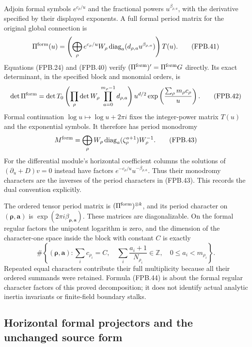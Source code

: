 Adjoin formal symbols \(e^{c_\rho/u}\) and the fractional powers
\(u^{\beta_{\rho,a}}\), with the derivative specified by their
displayed exponents. A full formal period matrix for the original
global connection is
\[
 \Pi^{\rm form}(u)=
   \left(\bigoplus_\rho
       e^{c_\rho/u}W_\rho
            \operatorname{diag}_a(d_{\rho,a}u^{\beta_{\rho,a}})
   \right)T(u).
 \tag{FPB.41}\label{eq:fpb-formal-period}
\]
Equations (FPB.24) and (FPB.40) verify
\((\Pi^{\rm form})'=\Pi^{\rm form}G\) directly. Its exact
determinant, in the specified block and monomial orders, is
\[
 \det\Pi^{\rm form}
   =\det T_0\left(\prod_\rho\det W_\rho
                              \prod_{a=0}^{m_\rho-1}d_{\rho,a}\right)
          u^{d/2}\exp\left(\frac{\sum_\rho m_\rho c_\rho}{u}\right).
 \tag{FPB.42}\label{eq:fpb-period-det}
\]
Formal continuation \(\log u\mapsto\log u+2\pi i\) fixes the
integer-power matrix \(T(u)\) and the exponential symbols. It
therefore has period monodromy
\[
 M^{\rm form}=\bigoplus_\rho
    W_\rho\operatorname{diag}_a(\zeta_\rho^{a+1})W_\rho^{-1}.
 \tag{FPB.43}\label{eq:fpb-formal-monodromy}
\]
For the differential module's horizontal coefficient columns the
solutions of \((\partial_u+D)v=0\) instead have factors
\(e^{-c_\rho/u}u^{-\beta_{\rho,a}}\). Thus their monodromy
characters are the inverses of the period characters in (FPB.43).
This records the dual convention explicitly.

The ordered tensor period matrix is
\((\Pi^{\rm form})^{\otimes k}\), and its period character on
\((\boldsymbol\rho,\boldsymbol a)\) is
\(\exp(2\pi i\beta_{\boldsymbol\rho,\boldsymbol a})\).
These matrices are diagonalizable. On the formal regular factors the
unipotent logarithm is zero, and the dimension of the character-one
space inside the block with constant \(C\) is exactly
\[
 \#\left\{(\boldsymbol\rho,\boldsymbol a):
    \sum_i c_{\rho_i}=C,\quad
    \sum_i\frac{a_i+1}{N_{\rho_i}}\in\mathbb Z,\quad
    0\le a_i<m_{\rho_i}\right\}.
 \tag{FPB.44}\label{eq:fpb-formal-invariants}
\]
Repeated equal characters contribute their full multiplicity because
all their ordered summands were retained. Formula (FPB.44) is about
the formal regular character factors of this proved decomposition;
it does not identify actual analytic inertia invariants or finite-field
boundary stalks.

\subsection{Horizontal formal projectors and the unchanged source form}

